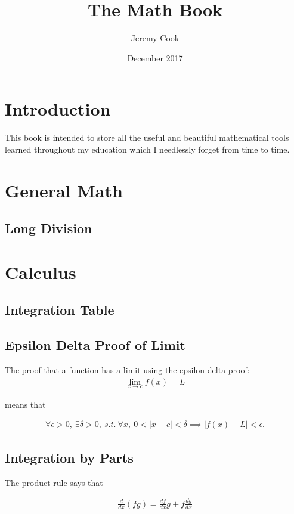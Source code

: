 \documentclass{article}
\title{The Math Book}
\author{Jeremy Cook}
\date{December 2017}
\numberwithin{theorem}{subsection}
\numberwithin{theorem}{subsubsection}
\numberwithin{lemma}{subsection}
\numberwithin{lemma}{subsubsection}
\theoremstyle{definition}
\numberwithin{definition}{subsection}
\numberwithin{definition}{subsubsection}
\begin{document}
\maketitle

\tableofcontents
\newpage

\section{Introduction}
This book is intended to store all the useful and beautiful mathematical tools learned throughout my education which I needlessly forget from time to time.
\section{General Math}
\subsection{Long Division}
\section{Calculus}
\subsection{Integration Table}

\subsection{Epsilon Delta Proof of Limit} 
The proof that a function has a limit using the epsilon delta proof:
\begin{gather*}
    \lim_{x \rightarrow c} f(x) = L
\end{gather*}

\noindent means that

\begin{gather*}
    \forall \epsilon > 0,\ \exists \delta > 0,\ s.t.\ \forall x,\ 0 < |x - c| < \delta \implies |f(x) - L| < \epsilon.
\end{gather*}

\subsection{Integration by Parts}
The product rule says that 

\begin{gather*}
    \frac{d}{dx}(fg) = \frac{df}{dx}g + f\frac{dg}{dx}
\end{gather*}
\end{document}
